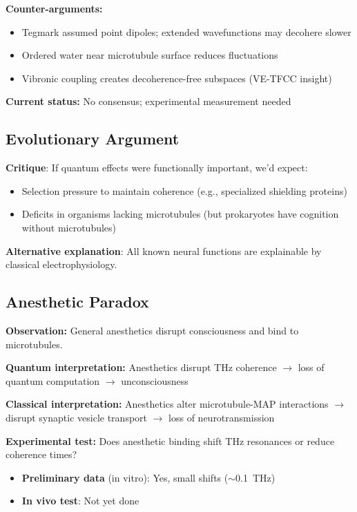 \textbf{Counter-arguments:}
\begin{itemize}
\item Tegmark assumed point dipoles; extended wavefunctions may decohere slower
\item Ordered water near microtubule surface reduces fluctuations
\item Vibronic coupling creates decoherence-free subspaces (VE-TFCC insight)
\end{itemize}

\textbf{Current status:} No consensus; experimental measurement needed

\subsection{Evolutionary Argument}
\label{subsec:evolutionary-argument}

\textbf{Critique}: If quantum effects were functionally important, we'd expect:
\begin{itemize}
\item Selection pressure to maintain coherence (e.g., specialized shielding proteins)
\item Deficits in organisms lacking microtubules (but prokaryotes have cognition without microtubules)
\end{itemize}

\textbf{Alternative explanation}: All known neural functions are explainable by classical electrophysiology.

\subsection{Anesthetic Paradox}
\label{subsec:anesthetic-paradox}

\textbf{Observation:} General anesthetics disrupt consciousness and bind to microtubules.

\textbf{Quantum interpretation:} Anesthetics disrupt THz coherence $\rightarrow$ loss of quantum computation $\rightarrow$ unconsciousness

\textbf{Classical interpretation:} Anesthetics alter microtubule-MAP interactions $\rightarrow$ disrupt synaptic vesicle transport $\rightarrow$ loss of neurotransmission

\textbf{Experimental test:} Does anesthetic binding shift THz resonances or reduce coherence times?
\begin{itemize}
\item \textbf{Preliminary data} (in vitro): Yes, small shifts ($\sim$0.1~THz)
\item \textbf{In vivo test}: Not yet done
\end{itemize}


